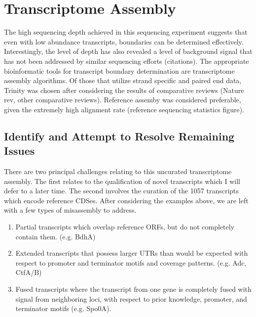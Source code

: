 

\chapter{Transcriptome Assembly}
The high sequencing depth achieved in this sequencing experiment suggests that even with low abundance transcripts, boundaries can be determined effectively. Interestingly, the level of depth has also revealed a level of background signal that has not been addressed by similar sequencing efforts (citations). The appropriate bioinformatic tools for transcript boundary determination are transcriptome assembly algorithms. Of those that utilize strand specific and paired end data, Trinity was chosen after considering the results of comparative reviews (Nature rev, other comparative reviews). Reference assemby was considered preferable, given the extremely high alignment rate (reference sequencing statistics figure).










\section{Identify and Attempt to Resolve Remaining Issues}
There are two principal challenges relating to this uncurated transcriptome assembly. The first relates to the qualification of novel transcripts which I will defer to a later time. The second involves the curation of the 1057 transcripts which encode reference CDSes. After considering the examples above, we are left with a few types of misassembly to address.
\begin{enumerate}
\item Partial transcripts which overlap reference ORFs, but do not completely contain them. (e.g. BdhA)
\item Extended transcripts that possess larger UTRs than would be expected with respect to promoter and terminator motifs and coverage patterns. (e.g. Adc, CtfA/B)
\item Fused transcripts where the transcript from one gene is completely fused with signal from neighboring loci, with respect to prior knowledge, promoter, and terminator motifs (e.g. Spo0A).
\end{enumerate}

